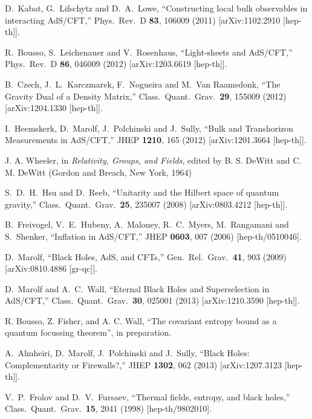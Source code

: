 \documentclass[12pt]{article}
\theoremstyle{remark}
\numberwithin{equation}{section}
\numberwithin{equation}{section}
\begin{document}
\begin{thebibliography}{99}
 D.~Kabat, G.~Lifschytz and D.~A.~Lowe,
  ``Constructing local bulk observables in interacting AdS/CFT,''
  Phys.\ Rev.\ D {\bf 83}, 106009 (2011)
  [arXiv:1102.2910 [hep-th]].

  R.~Bousso, S.~Leichenauer and V.~Rosenhaus,
  ``Light-sheets and AdS/CFT,''
  Phys.\ Rev.\ D {\bf 86}, 046009 (2012)
  [arXiv:1203.6619 [hep-th]].

  B.~Czech, J.~L.~Karczmarek, F.~Nogueira and M.~Van Raamsdonk,
  ``The Gravity Dual of a Density Matrix,''
  Class.\ Quant.\ Grav.\  {\bf 29}, 155009 (2012)
  [arXiv:1204.1330 [hep-th]].

  I.~Heemskerk, D.~Marolf, J.~Polchinski and J.~Sully,
  ``Bulk and Transhorizon Measurements in AdS/CFT,''
  JHEP {\bf 1210}, 165 (2012)
  [arXiv:1201.3664 [hep-th]].

J. A. Wheeler, in \textit{Relativity, Groups, and Fields}, edited by B. S. DeWitt and C. M. DeWitt
(Gordon and Breach, New York, 1964)

  S.~D.~H.~Hsu and D.~Reeb,
  ``Unitarity and the Hilbert space of quantum gravity,''
  Class.\ Quant.\ Grav.\  {\bf 25}, 235007 (2008)
  [arXiv:0803.4212 [hep-th]].

  B.~Freivogel, V.~E.~Hubeny, A.~Maloney, R.~C.~Myers, M.~Rangamani and S.~Shenker,
  ``Inflation in AdS/CFT,''
  JHEP {\bf 0603}, 007 (2006)
  [hep-th/0510046].

  D.~Marolf,
  ``Black Holes, AdS, and CFTs,''
  Gen.\ Rel.\ Grav.\  {\bf 41}, 903 (2009)
  [arXiv:0810.4886 [gr-qc]].

  D.~Marolf and A.~C.~Wall,
  ``Eternal Black Holes and Superselection in AdS/CFT,''
  Class.\ Quant.\ Grav.\  {\bf 30}, 025001 (2013)
  [arXiv:1210.3590 [hep-th]].

R. Bousso, Z. Fisher, and A. C. Wall, ``The covariant entropy bound as a quantum focussing
theorem'', in preparation.


  A.~Almheiri, D.~Marolf, J.~Polchinski and J.~Sully,
  ``Black Holes: Complementarity or Firewalls?,''
  JHEP {\bf 1302}, 062 (2013)
  [arXiv:1207.3123 [hep-th]].

  V.~P.~Frolov and D.~V.~Fursaev,
  ``Thermal fields, entropy, and black holes,''
  Class.\ Quant.\ Grav.\  {\bf 15}, 2041 (1998)
  [hep-th/9802010].




\end{thebibliography}
\end{document}
